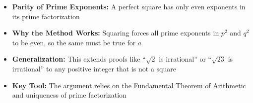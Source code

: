 \begin{takeaways}
\begin{itemize}
\item \textbf{Parity of Prime Exponents:} A perfect square has only even exponents in its prime factorization
\item \textbf{Why the Method Works:} Squaring forces all prime exponents in $p^2$ and $q^2$ to be even, so the same must be true for $a$
\item \textbf{Generalization:} This extends proofs like ``$\sqrt{2}$ is irrational'' or ``$\sqrt{23}$ is irrational'' to any positive integer that is not a square
\item \textbf{Key Tool:} The argument relies on the Fundamental Theorem of Arithmetic and uniqueness of prime factorization
\end{itemize}
\end{takeaways}
